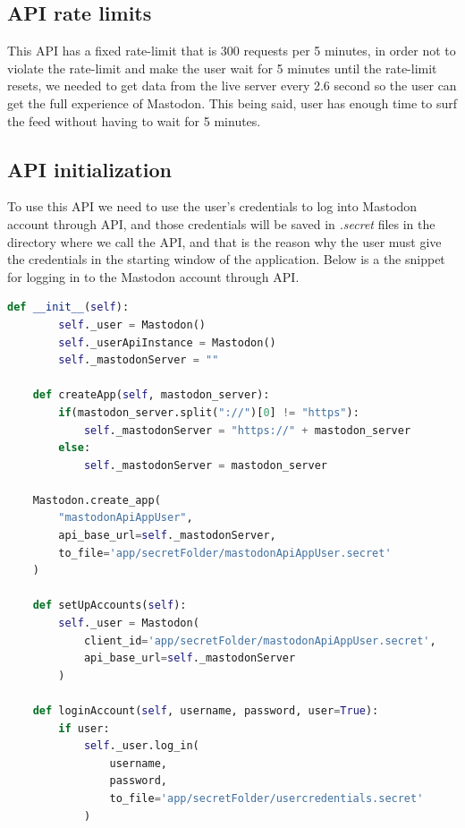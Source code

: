 \subsection{API rate limits}\label{ss:rate_lim}
This API has a fixed rate-limit that is 300 requests per 5 minutes, in order not to
violate the rate-limit and make the user wait for 5 minutes until the rate-limit resets, we
needed to get data from the live server every 2.6 second so the user can get the full
experience of Mastodon. This being said, user has enough time to surf the feed without having
to wait for 5 minutes.
\subsection{API initialization}\label{ss:api_init}
To use this API we need to use the user's credentials to log into Mastodon account through API, and those credentials will be saved in \textit{.secret} files in the directory where we call the API, and that is the reason why the user must give the credentials in the starting window of the application. Below is a the snippet for logging in to the Mastodon account through API.
\\[5pt]
\begin{lstlisting}[language=python, caption={Logging in to Mastodon account through API}, captionpos=b ]
	def __init__(self):
		self._user = Mastodon()
		self._userApiInstance = Mastodon()
		self._mastodonServer = ""
	
	def createApp(self, mastodon_server):
		if(mastodon_server.split("://")[0] != "https"):
			self._mastodonServer = "https://" + mastodon_server
		else:
			self._mastodonServer = mastodon_server
	
	Mastodon.create_app(
		"mastodonApiAppUser",
		api_base_url=self._mastodonServer,
		to_file='app/secretFolder/mastodonApiAppUser.secret'
	)
	
	def setUpAccounts(self):
		self._user = Mastodon(
			client_id='app/secretFolder/mastodonApiAppUser.secret',
			api_base_url=self._mastodonServer
		)
	
	def loginAccount(self, username, password, user=True):
		if user:
			self._user.log_in(
				username,
				password,
				to_file='app/secretFolder/usercredentials.secret' 
			)
\end{lstlisting}

